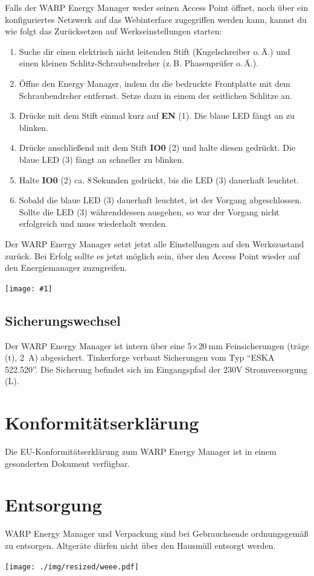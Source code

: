 \documentclass[a4paper,10pt]{article}
\newcommand{\gfx}[1]{\texttt{[image: \#1]}}
\begin{document}
\begin{multicols*}{2}
	Falls der WARP Energy Manager weder seinen Access Point öffnet, noch über ein konfiguriertes Netzwerk auf das Webinterface zugegriffen werden kann,
	kannst du wie folgt das Zurücksetzen auf Werkseinstellungen starten:
	\begin{enumerate}
	 \item Suche dir einen elektrisch nicht leitenden Stift (Kugelschreiber o.\,Ä.) und einen kleinen Schlitz-Schraubendreher (z.\,B. Phasenprüfer o.\,Ä.).
	 \item Öffne den Energy Manager, indem du die bedruckte Frontplatte mit dem Schraubendreher entfernst. Setze dazu in einem der seitlichen Schlitze an.
	 \item Drücke mit dem Stift einmal kurz auf \textbf{EN} (1). Die blaue LED fängt an zu blinken.
	 \item Drücke anschließend mit dem Stift \textbf{IO0} (2) und halte diesen gedrückt. Die blaue LED (3) fängt an schneller zu blinken.
	 \item Halte \textbf{IO0} (2) ca. 8\,Sekunden gedrückt, bis die LED (3) dauerhaft leuchtet.
	 \item Sobald die blaue LED (3) dauerhaft leuchtet, ist der Vorgang abgeschlossen. Sollte die LED (3) währenddessen ausgehen, so war der Vorgang nicht erfolgreich und muss wiederholt werden.
	\end{enumerate}
	Der WARP Energy Manager setzt jetzt alle Einstellungen auf den Werkszustand zurück. Bei Erfolg sollte es jetzt möglich sein, über den Access Point wieder auf den Energiemanager zuzugreifen.

	\gfx{./img/resized/factory_reset_2}

	\subsection{Sicherungswechsel}
	Der WARP Energy Manager ist intern über eine 5$\times\SI{20}{\milli\meter}$ Feinsicherungen (träge (t), \SI{2}{\ampere}) abgesichert.
	Tinkerforge verbaut Sicherungen vom Typ \enquote{ESKA 522.520}. Die 
	Sicherung befindet sich im Eingangspfad der 230V Stromversorgung (L).

	\section{Konformitätserklärung}
	Die EU-Konformitätserklärung zum WARP Energy Manager ist in einem gesonderten Dokument verfügbar.

	\section{Entsorgung}
	\begin{minipage}{0.43\textwidth}
		WARP Energy Manager und Verpackung sind bei Gebrauchsende ordnungsgemäß zu
		entsorgen. Altgeräte dürfen nicht über den Hausmüll entsorgt werden.
	\end{minipage}\hfill
	\begin{minipage}{0.045\textwidth}
		\texttt{[image: ./img/resized/weee.pdf]}
	\end{minipage}


\end{multicols*}
\end{document}
